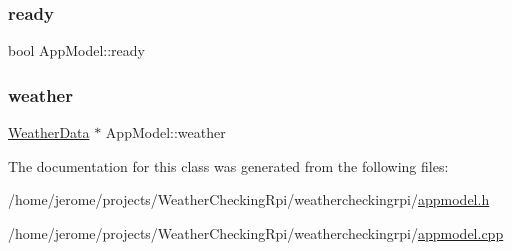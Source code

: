 \mbox{\label{class_app_model_a2af4f584bf701bff4546e889c16316d7}} 
\subsubsection{\texorpdfstring{ready}{ready}}
{\footnotesize\ttfamily bool App\+Model\+::ready\hspace{0.3cm}{\ttfamily [read]}}

\mbox{\label{class_app_model_a72dfc16433c4ca50da689205e9db9298}} 
\subsubsection{\texorpdfstring{weather}{weather}}
{\footnotesize\ttfamily \hyperlink{class_weather_data}{Weather\+Data} $\ast$ App\+Model\+::weather\hspace{0.3cm}{\ttfamily [read]}}



The documentation for this class was generated from the following files\+:\begin{DoxyCompactItemize}
\item 
/home/jerome/projects/\+Weather\+Checking\+Rpi/weathercheckingrpi/\hyperlink{appmodel_8h}{appmodel.\+h}\item 
/home/jerome/projects/\+Weather\+Checking\+Rpi/weathercheckingrpi/\hyperlink{appmodel_8cpp}{appmodel.\+cpp}\end{DoxyCompactItemize}
